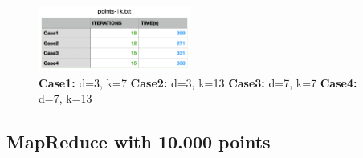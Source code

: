 \documentclass{book}
\begin{document}
    \begin{figure}[H]
        \hfill
        \hfill
        \hfill
        \includegraphics[width=5cm]{hadoop/tabella_point1k}
        \centering
        \caption{\footnotesize{\textbf{Case1:} d=3, k=7 \textbf{Case2:} d=3, k=13 \textbf{Case3:} d=7, k=7 \textbf{Case4:} d=7, k=13}}
    \end{figure}

    \subsection{MapReduce with 10.000 points}
    \paragraph{}
\end{document}
